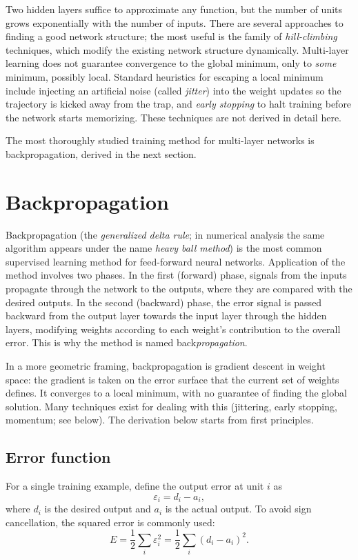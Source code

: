 \documentclass[12pt]{article}
\begin{document}
Two hidden layers suffice to approximate any function, but the number of units grows exponentially with the number of inputs. There are several approaches to finding a good network structure; the most useful is the family of \emph{hill-climbing} techniques, which modify the existing network structure dynamically. Multi-layer learning does not guarantee convergence to the global minimum, only to \emph{some} minimum, possibly local. Standard heuristics for escaping a local minimum include injecting an artificial noise (called \emph{jitter}) into the weight updates so the trajectory is kicked away from the trap, and \emph{early stopping} to halt training before the network starts memorizing. These techniques are not derived in detail here.

The most thoroughly studied training method for multi-layer networks is backpropagation, derived in the next section.

\section{Backpropagation}
Backpropagation (the \emph{generalized delta rule}; in numerical analysis the same algorithm appears under the name \emph{heavy ball method}) is the most common supervised learning method for feed-forward neural networks. Application of the method involves two phases. In the first (forward) phase, signals from the inputs propagate through the network to the outputs, where they are compared with the desired outputs. In the second (backward) phase, the error signal is passed backward from the output layer towards the input layer through the hidden layers, modifying weights according to each weight's contribution to the overall error. This is why the method is named back\emph{propagation}.

In a more geometric framing, backpropagation is gradient descent in weight space: the gradient is taken on the error surface that the current set of weights defines. It converges to a local minimum, with no guarantee of finding the global solution. Many techniques exist for dealing with this (jittering, early stopping, momentum; see below). The derivation below starts from first principles.

\subsection{Error function}
For a single training example, define the output error at unit $i$ as
\begin{equation}
  \varepsilon_i = d_i - a_i,
\end{equation}
where $d_i$ is the desired output and $a_i$ is the actual output. To avoid sign cancellation, the squared error is commonly used:
\begin{equation}
  E = \frac{1}{2}\sum_i \varepsilon_i^2
    = \frac{1}{2}\sum_i (d_i-a_i)^2.
\end{equation}
\end{document}
